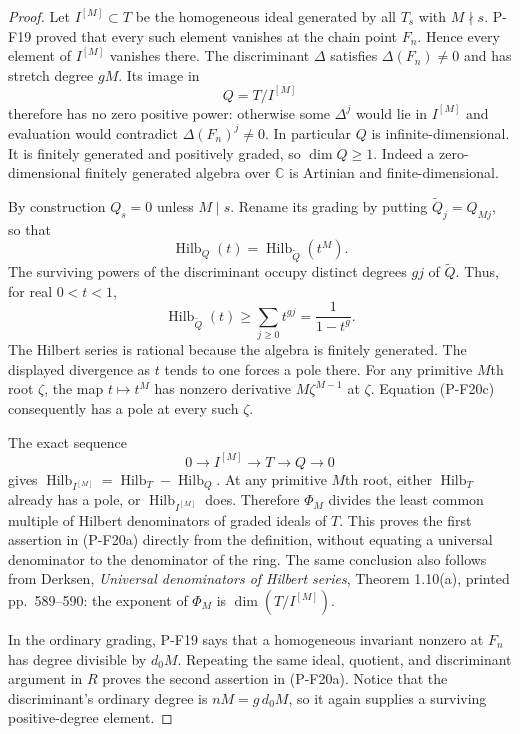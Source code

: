 \documentclass[11pt,a4paper]{article}
\begin{document}
\begin{proof}
Let $I^{[M]}\subset T$ be the homogeneous ideal generated by all
$T_s$ with $M\nmid s$. P-F19 proved that every such element
vanishes at the chain point $F_n$. Hence every element of
$I^{[M]}$ vanishes there. The discriminant $\Delta$ satisfies
$\Delta(F_n)\ne0$ and has stretch degree $gM$. Its image in
\[
 Q=T/I^{[M]}
\]
therefore has no zero positive power: otherwise some $\Delta^j$
would lie in $I^{[M]}$ and evaluation would contradict
$\Delta(F_n)^j\ne0$. In particular $Q$ is infinite-dimensional.
It is finitely generated and positively graded, so $\dim Q\ge1$.
Indeed a zero-dimensional finitely generated algebra over
$\mathbb C$ is Artinian and finite-dimensional.

By construction $Q_s=0$ unless $M\mid s$. Rename its grading by
putting $\widetilde Q_j=Q_{Mj}$, so that
\[
 \operatorname{Hilb}_Q(t)
   =\operatorname{Hilb}_{\widetilde Q}(t^M).
 \tag{P-F20c}
\]
The surviving powers of the discriminant occupy distinct degrees
$gj$ of $\widetilde Q$. Thus, for real $0<t<1$,
\[
 \operatorname{Hilb}_{\widetilde Q}(t)
    \ge\sum_{j\ge0}t^{gj}=\frac1{1-t^g}.
\]
The Hilbert series is rational because the algebra is finitely
generated. The displayed divergence as $t$ tends to one forces
a pole there. For any primitive $M$th root $\zeta$, the map
$t\mapsto t^M$ has nonzero derivative $M\zeta^{M-1}$ at
$\zeta$. Equation (P-F20c) consequently has a pole at every
such $\zeta$.

The exact sequence
\[
 0\longrightarrow I^{[M]}\longrightarrow T
     \longrightarrow Q\longrightarrow0
\]
gives
$\operatorname{Hilb}_{I^{[M]}}=
 \operatorname{Hilb}_T-\operatorname{Hilb}_Q$.
At any primitive $M$th root, either $\operatorname{Hilb}_T$
already has a pole, or $\operatorname{Hilb}_{I^{[M]}}$ does.
Therefore $\Phi_M$ divides the least common multiple of
Hilbert denominators of graded ideals of $T$. This proves the
first assertion in (P-F20a) directly from the definition, without
equating a universal denominator to the denominator of the ring.
The same conclusion also follows from Derksen, \emph{Universal
denominators of Hilbert series}, Theorem 1.10(a), printed
pp.~589--590: the exponent of $\Phi_M$ is
$\dim(T/I^{[M]})$.

In the ordinary grading, P-F19 says that a homogeneous invariant
nonzero at $F_n$ has degree divisible by $d_0M$. Repeating the
same ideal, quotient, and discriminant argument in $R$ proves
the second assertion in (P-F20a). Notice that the discriminant's
ordinary degree is $nM=g\,d_0M$, so it again supplies a surviving
positive-degree element.


\end{proof}
\end{document}
